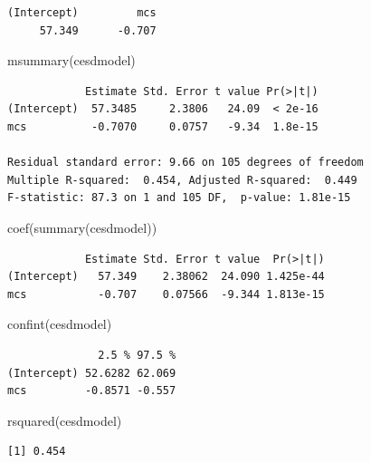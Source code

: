 \documentclass[
  ngerman,
]{scrbook}
\newenvironment{Shaded}{\begin{snugshade}}{\end{snugshade}}
\newcommand{\FunctionTok}[1]{\textcolor[rgb]{0.00,0.00,0.00}{#1}}
\newcommand{\NormalTok}[1]{#1}
\begin{document}
\begin{verbatim}
(Intercept)         mcs 
     57.349      -0.707 
\end{verbatim}

\begin{Shaded}
\begin{Highlighting}[]
\FunctionTok{msummary}\NormalTok{(cesdmodel)}
\end{Highlighting}
\end{Shaded}

\begin{verbatim}
            Estimate Std. Error t value Pr(>|t|)
(Intercept)  57.3485     2.3806   24.09  < 2e-16
mcs          -0.7070     0.0757   -9.34  1.8e-15

Residual standard error: 9.66 on 105 degrees of freedom
Multiple R-squared:  0.454, Adjusted R-squared:  0.449 
F-statistic: 87.3 on 1 and 105 DF,  p-value: 1.81e-15
\end{verbatim}

\begin{Shaded}
\begin{Highlighting}[]
\FunctionTok{coef}\NormalTok{(}\FunctionTok{summary}\NormalTok{(cesdmodel))}
\end{Highlighting}
\end{Shaded}

\begin{verbatim}
            Estimate Std. Error t value  Pr(>|t|)
(Intercept)   57.349    2.38062  24.090 1.425e-44
mcs           -0.707    0.07566  -9.344 1.813e-15
\end{verbatim}

\begin{Shaded}
\begin{Highlighting}[]
\FunctionTok{confint}\NormalTok{(cesdmodel)}
\end{Highlighting}
\end{Shaded}

\begin{verbatim}
              2.5 % 97.5 %
(Intercept) 52.6282 62.069
mcs         -0.8571 -0.557
\end{verbatim}

\begin{Shaded}
\begin{Highlighting}[]
\FunctionTok{rsquared}\NormalTok{(cesdmodel)}
\end{Highlighting}
\end{Shaded}

\begin{verbatim}
[1] 0.454
\end{verbatim}
\end{document}
